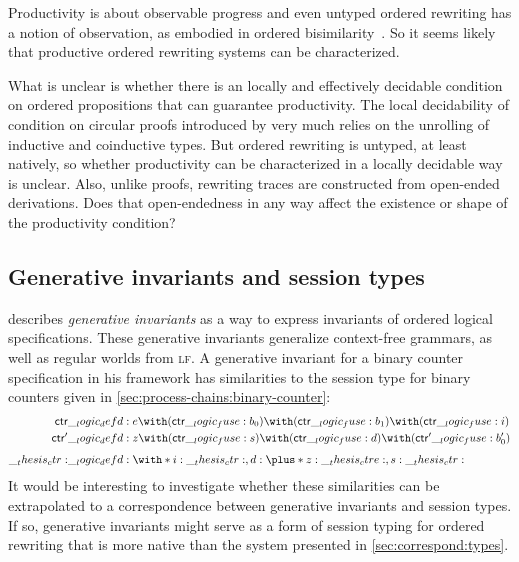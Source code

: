 Productivity is about observable progress and even untyped ordered rewriting has a notion of observation, as embodied in ordered bisimilarity~.
So it seems likely that productive ordered rewriting systems can be characterized.

What is unclear is whether there is an locally and effectively decidable condition on ordered propositions that can guarantee productivity.
The local decidability of condition on circular proofs introduced by \citeauthor{Derakhshan+Pfenning:LMCS20}
very much relies on the unrolling of inductive and coinductive types.
But ordered rewriting is untyped, at least natively, so whether productivity can be characterized in a locally decidable way is unclear.
Also, unlike proofs, rewriting traces are constructed from open-ended derivations.
Does that open-endedness in any way affect the existence or shape of the productivity condition?

\subsection{Generative invariants and session types}

 describes \emph{generative invariants} as a way to express invariants of ordered logical specifications.
These generative invariants generalize context-free grammars, as well as regular worlds from \textsc{lf}.
A generative invariant for a binary counter specification in his framework has similarities to the session type for binary counters given in \cref{sec:process-chains:binary-counter}:
\begin{align*}
  \mathsf{ctr} &\defd e \with (\mathsf{ctr} \fuse b_0) \with (\mathsf{ctr} \fuse b_1) \with (\mathsf{ctr} \fuse i) \\
  \mathsf{ctr}' &\defd z \with (\mathsf{ctr} \fuse s) \with (\mathsf{ctr} \fuse d) \with (\mathsf{ctr}' \fuse b'_0) \\[1ex]
  \ctr &\defd \with*{ i: \ctr , d: \plus*{ z: \ctre , s: \ctr } }
\end{align*}
It would be interesting to investigate whether these similarities can be extrapolated to a correspondence between generative invariants and session types.
If so, generative invariants might serve as a form of session typing for ordered rewriting that is more native than the system presented in \cref{sec:correspond:types}.

